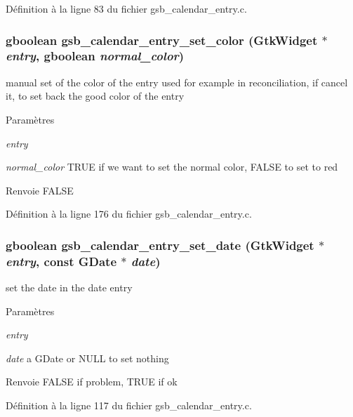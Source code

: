 Définition à la ligne 83 du fichier gsb\_\-calendar\_\-entry.c.

\subsubsection[{gsb\_\-calendar\_\-entry\_\-set\_\-color}]{\setlength{\rightskip}{0pt plus 5cm}gboolean gsb\_\-calendar\_\-entry\_\-set\_\-color (GtkWidget $\ast$ {\em entry}, \/  gboolean {\em normal\_\-color})}\label{gsb__calendar__entry_8h_a96d4491d6d3f64c9a1e567305cbfae82}
manual set of the color of the entry used for example in reconciliation, if cancel it, to set back the good color of the entry


\begin{DoxyParams}{Paramètres}
\item[{\em entry}]\item[{\em normal\_\-color}]TRUE if we want to set the normal color, FALSE to set to red\end{DoxyParams}
\begin{DoxyReturn}{Renvoie}
FALSE 
\end{DoxyReturn}


Définition à la ligne 176 du fichier gsb\_\-calendar\_\-entry.c.

\subsubsection[{gsb\_\-calendar\_\-entry\_\-set\_\-date}]{\setlength{\rightskip}{0pt plus 5cm}gboolean gsb\_\-calendar\_\-entry\_\-set\_\-date (GtkWidget $\ast$ {\em entry}, \/  const GDate $\ast$ {\em date})}\label{gsb__calendar__entry_8h_af96bec76fa28a05a4ea3355cccb68b96}
set the date in the date entry


\begin{DoxyParams}{Paramètres}
\item[{\em entry}]\item[{\em date}]a GDate or NULL to set nothing\end{DoxyParams}
\begin{DoxyReturn}{Renvoie}
FALSE if problem, TRUE if ok 
\end{DoxyReturn}


Définition à la ligne 117 du fichier gsb\_\-calendar\_\-entry.c.

